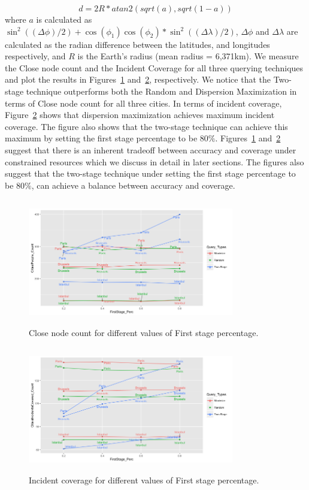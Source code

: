 \documentclass{acm_proc_article-sp}
\begin{document}
\begin{equation} \label{eq:maxDisp2}
d = 2R*atan2(sqrt(a), sqrt(1-a))
\end{equation}
where $a$ is calculated as $ \sin ^2((\Delta \phi)/2 ) + \cos(\phi_1)\cos(\phi_2) * \sin ^2((\Delta \lambda)/2 )$, $\Delta \phi$ and $\Delta \lambda$ are calculated as the radian difference between the latitudes, and longitudes respectively, and $R$ is the Earth's radius (mean radius = 6,371km). We measure the Close node count and the Incident Coverage for all three querying techniques and plot the results in Figures~\ref{fig: hollaCloseCount} and~\ref{fig: hollaIncCoverage}, respectively. We notice that the Two-stage technique outperforms both the Random and Dispersion Maximization in terms of Close node count for all three cities. In terms of incident coverage, Figure~\ref{fig: hollaIncCoverage} shows that dispersion maximization achieves maximum incident coverage. The figure also shows that the two-stage technique can achieve this maximum by setting the first stage percentage to be $80\%$. Figures~\ref{fig: hollaCloseCount} and~\ref{fig: hollaIncCoverage} suggest that there is an inherent tradeoff between accuracy and coverage under constrained resources which we discuss in detail in later sections. The figures also suggest that the two-stage technique under setting the first stage percentage to be $80\%$, can achieve a balance between accuracy and coverage.\par
\begin{figure}[!h]
\centering
\includegraphics[width=9cm ,height=5.5cm]{figuresPng/hollaCloseCnt.png}
\caption{Close node count for different values of First stage percentage. }
\label{fig: hollaCloseCount}
\end{figure}
\begin{figure}[!h]
\centering
\includegraphics[width=9cm ,height=5.5cm]{figuresPng/citiesInc.png}
\caption{Incident coverage for different values of First stage percentage. }
\label{fig: hollaIncCoverage}
\end{figure}
\end{document}
